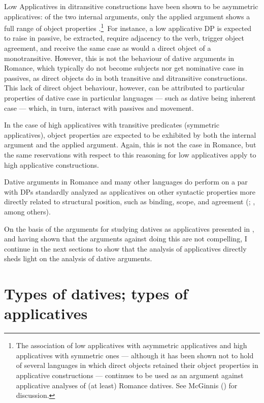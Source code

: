 \documentclass[output=paper,colorlinks,citecolor=brown,modfonts,nonflat]{langsci/langscibook}
\begin{document}
Low Applicatives in ditransitive constructions have been shown to be asymmetric applicatives:  of the two internal arguments, only the applied argument shows a full range of object properties \citep[203]{Pylkkänen2000}.\footnote{The association of low applicatives with asymmetric applicatives and high applicatives with symmetric ones — although it has been shown not to hold of several languages in which direct objects retained their object properties in applicative constructions — continues to be used as an argument against applicative analyses of (at least) Romance datives. See McGinnis (\citeyear{McGinnis2004,McGinnis2008}) for discussion.}~For instance, a low applicative DP is expected to raise in passive, be extracted, require adjacency to the verb, trigger object agreement, and receive the same case as would a direct object of a monotransitive. However, this is not the behaviour of dative arguments in Romance, which typically do not become subjects nor get nominative case in passives, as direct objects do in both transitive and ditransitive constructions. This lack of direct object behaviour, however, can be attributed to particular properties of dative case in particular languages — such as dative being inherent case — which, in turn, interact with passives and movement.

In the case of high applicatives with transitive predicates (symmetric applicatives), object properties are expected to be exhibited by both the internal argument and the applied argument. Again, this is not the case in Romance, but the same reservations with respect to this reasoning for low applicatives apply to high applicative constructions.

Dative arguments in Romance and many other languages do perform on a par with DPs standardly analyzed as applicatives on other syntactic properties more directly related to structural position, such as  binding, scope, and agreement (; \citealt{BonehNash2017, Bruening2010Ditrans, Cuervo2003, Demonte1995, Pineda2016, Pineda2020}, among others).

On the basis of the arguments for studying datives as applicatives presented in , and having shown that the arguments against doing this are not compelling, I continue in the next sections to show that the analysis of applicatives directly sheds light on the analysis of dative arguments.

\section{Types of datives; types of applicatives}\label{sec:cuervo:3}
\end{document}
